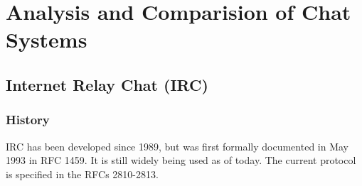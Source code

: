 \chapter{Analysis and Comparision of Chat Systems}
\section{Internet Relay Chat (IRC)}
\subsection{History}
IRC has been developed since 1989, but was first formally documented in May 1993 in 
RFC 1459. It is still widely being used as of today.\cite{rfc1459,ircusage}
The current protocol is specified in the RFCs 2810-2813.\cite{rfc2810,rfc2811,rfc2812,rfc2813}
